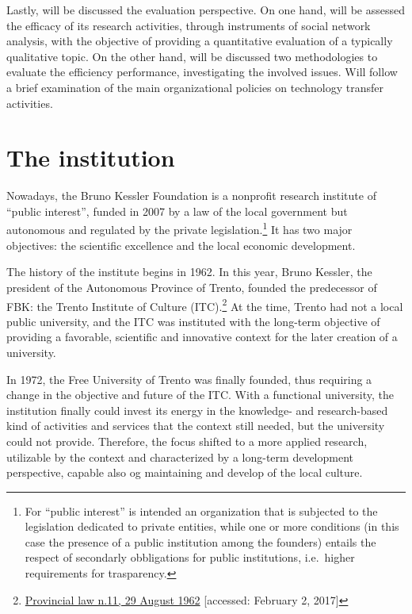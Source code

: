 Lastly, will be discussed the evaluation perspective. On one hand, will be assessed the efficacy of its research activities, through instruments of social network analysis, with the objective of providing a quantitative evaluation of a typically qualitative topic. On the other hand, will be discussed two methodologies to evaluate the efficiency performance, investigating the involved issues. Will follow a brief examination of the main organizational policies on technology transfer activities.

\section{The institution}

Nowadays, the Bruno Kessler Foundation is a nonprofit research institute of \enquote{public interest}, funded in 2007 by a law of the local government but autonomous and regulated by the private legislation.\footnote{For \enquote{public interest} is intended an organization that is subjected to the legislation dedicated to private entities, while one or more conditions (in this case the presence of a public institution among the founders) entails the respect of secondarly obbligations for public institutions, i.e.\ higher requirements for trasparency.} It has two major objectives: the scientific excellence and the local economic development.

The history of the institute begins in 1962. In this year, Bruno Kessler, the president of the Autonomous Province of Trento, founded the predecessor of FBK: the Trento Institute of Culture (ITC).\footnote{
	\href{http://www.consiglio.provincia.tn.it/leggi-e-archivi/codice-provinciale/archivio/Pages/Legge\%20provinciale\%2029\%20agosto\%201962,\%20n.\%2011_565.aspx}
	{Provincial law n.11, 29 August 1962}
	[accessed: February 2, 2017]
} At the time, Trento had not a local public university, and the ITC was instituted with the long-term objective of providing a favorable, scientific and innovative context for the later creation of a university. 

In 1972, the Free University of Trento was finally founded, thus requiring a change in the objective and future of the ITC. With a functional university, the institution finally could invest its energy in the knowledge- and research-based kind of activities and services that the context still needed, but the university could not provide. Therefore, the focus shifted to a more applied research, utilizable by the context and characterized by a long-term development perspective, capable also og maintaining and develop of the local culture.

